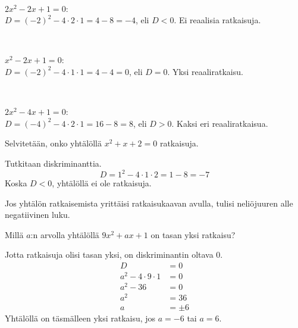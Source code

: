 \begin{esimerkki}
\ \\
\parbox{4.5cm}{
\begin{kuvaajapohja}{1}{-1}{3}{-1}{3}
\end{kuvaajapohja}
}
\parbox{6cm}{$2x^2-2x+1=0$:\\$D=(-2)^2-4 \cdot 2 \cdot 1=4-8=-4$, eli $D <0$. Ei reaalisia ratkaisuja.}
\\
\parbox{4.5cm}{
\begin{kuvaajapohja}{1}{-1}{3}{-1}{3}
\end{kuvaajapohja}
}
\parbox{6cm}{$x^2-2x+1=0$:\\$D=(-2)^2-4 \cdot 1 \cdot 1=4-4=0$, eli $D = 0$. Yksi reaaliratkaisu.}
\\
\parbox{4.5cm}{
\begin{kuvaajapohja}{1}{-1}{3}{-2}{2}
\end{kuvaajapohja}
}
\parbox{6cm}{$2x^2-4x+1=0$:\\$D=(-4)^2-4 \cdot 2 \cdot 1=16-8=8$, eli $D > 0$. Kaksi eri reaaliratkaisua.}
\end{esimerkki}

\newpage

\begin{esimerkki}
Selvitetään, onko yhtälöllä $x^2+x+2=0$ ratkaisuja.

Tutkitaan diskriminanttia.
\[D=1^2-4\cdot 1 \cdot 2 = 1-8 = -7\]
Koska $D<0$, yhtälöllä ei ole ratkaisuja.

Jos yhtälön ratkaisemista yrittäisi ratkaisukaavan avulla, tulisi
neliöjuuren alle negatiivinen luku.
\end{esimerkki}

\begin{esimerkki}
Millä $a$:n arvolla yhtälöllä $9x^2+ax+1$ on tasan yksi ratkaisu?

Jotta ratkaisuja olisi tasan yksi, on diskriminantin oltava 0.
\begin{align*}
D &= 0\\
a^2-4\cdot 9\cdot 1 &= 0\\
a^2-36 &= 0\\
a^2 &= 36\\
a &= \pm 6
\end{align*}
Yhtälöllä on täsmälleen yksi ratkaisu, jos $a=-6$ tai $a=6$.
\end{esimerkki}


